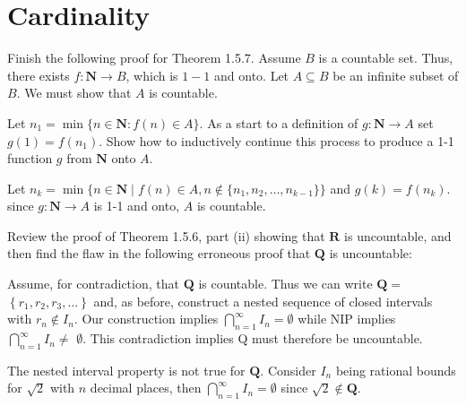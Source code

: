 \section{Cardinality}

\begin{exercise}
  Finish the following proof for Theorem 1.5.7.
  Assume $B$ is a countable set. Thus, there exists $f: \mathbf{N} \rightarrow B$, which is $1-1$ and onto. Let $A \subseteq B$ be an infinite subset of $B$. We must show that $A$ is countable.

  Let $n_{1}=\min \{n \in \mathbf{N}: f(n) \in A\}$.
  As a start to a definition of $g: \mathbf{N} \rightarrow A$ set $g(1)=f\left(n_{1}\right)$.
  Show how to inductively continue this process to produce a 1-1 function $g$ from $\mathbf{N}$ onto $A$.
\end{exercise}

\begin{solution}
  Let $n_k = \min\{n \in \mathbf N \mid f(n) \in A, n \notin \{n_1, n_2, \dots, n_{k-1}\}\}$
  and $g(k) = f(n_k)$. since $g : \mathbf N \to A$ is 1-1 and onto, $A$ is countable.
\end{solution}

\begin{exercise}
  Review the proof of Theorem 1.5.6, part (ii) showing that $\mathbf{R}$ is uncountable, and then find the flaw in the following erroneous proof that $\mathbf{Q}$ is uncountable:

  Assume, for contradiction, that $\mathbf{Q}$ is countable. Thus we can write $\mathbf{Q}=$ $\left\{r_{1}, r_{2}, r_{3}, \ldots\right\}$ and, as before, construct a nested sequence of closed intervals with $r_{n} \notin I_{n}$. Our construction implies $\bigcap_{n=1}^{\infty} I_{n}=\emptyset$ while NIP implies $\bigcap_{n=1}^{\infty} I_{n} \neq$ $\emptyset$. This contradiction implies Q must therefore be uncountable.
\end{exercise}

\begin{solution}
  The nested interval property is not true for $\mathbf{Q}$. Consider $I_n$ being rational bounds for $\sqrt2$ with $n$ decimal places, then $\bigcap_{n=1}^\infty I_n = \emptyset$ since $\sqrt2 \notin \mathbf{Q}$.
\end{solution}

